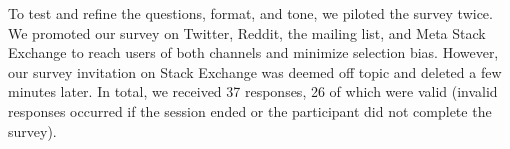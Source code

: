 To test and refine the questions, format, and tone, we piloted the survey twice. 
We promoted our survey on Twitter, Reddit, the \RH mailing list, and Meta Stack Exchange to reach users of both channels and minimize selection bias. However, our survey invitation on Stack Exchange was deemed off topic and deleted a few minutes later. In total, we received 37 responses, 26 of which were valid (invalid responses occurred if the session ended or the participant did not complete the survey).

